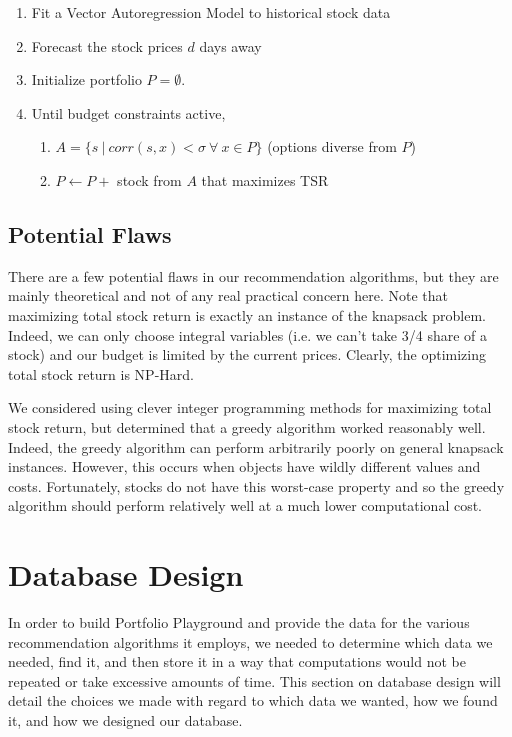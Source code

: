 \documentclass{article}
\begin{document}
\begin{enumerate}
	\item Fit a Vector Autoregression Model to historical stock data
	\item Forecast the stock prices $d$ days away
	\item Initialize portfolio $P = \emptyset$. 
	\item Until budget constraints active,
		\begin{enumerate}
			\item $A = \{s \ | \ corr(s,x) < \sigma \ \forall \ x \in P\}$ (options diverse from $P$)
			\item $P \leftarrow P +$ stock from $A$ that maximizes TSR
		\end{enumerate}
\end{enumerate}

\subsection{Potential Flaws}
There are a few potential flaws in our recommendation algorithms, but they are mainly theoretical and not of any real practical concern here. Note that maximizing total stock return is exactly an instance of the knapsack problem. Indeed, we can only choose integral variables (i.e. we can't take 3/4 share of a stock) and our budget is limited by the current prices. Clearly, the optimizing total stock return is NP-Hard. 

We considered using clever integer programming methods for maximizing total stock return, but determined that a greedy algorithm worked reasonably well. Indeed, the greedy algorithm can perform arbitrarily poorly on general knapsack instances. However, this occurs when objects have wildly different values and costs. Fortunately, stocks do not have this worst-case property and so the greedy algorithm should perform relatively well at a much lower computational cost.

\section{Database Design} \label{sec:db}
In order to build Portfolio Playground and provide the data for the various recommendation algorithms it employs, we needed to determine which data we needed, find it, and then store it in a way that computations would not be repeated or take excessive amounts of time.  This section on database design will detail the choices we made with regard to which data we wanted, how we found it, and how we designed our database.
\end{document}
